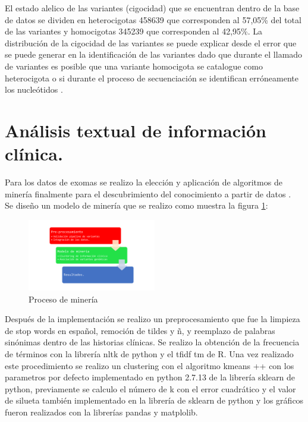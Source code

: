 El estado alelico de las variantes (cigocidad) que se encuentran dentro de la base de datos se dividen en heterocigotas 458639 que corresponden al 57,05\% del total de las variantes  y homocigotas 345239 que corresponden al 42,95\%. La distribución de la cigocidad de las variantes se puede explicar desde el error que se puede generar en la identificación de las variantes dado que durante el llamado  de variantes es posible que una variante homocigota se catalogue como heterocigota o si durante el proceso de secuenciación se identifican erróneamente los nucleótidos \cite{Babraham2016}\cite{Pirooznia2014}. 



\section{Análisis textual de información clínica.}



Para los datos de exomas se realizo la elección y aplicación de algoritmos de minería finalmente para el descubrimiento del conocimiento a partir de datos  \cite{Farid2016}. \\

Se diseño un modelo de minería que se realizo como muestra la figura \ref{fig:mineria}:

\begin{figure}[H]
	\centering
	\includegraphics[width=0.5\textwidth]{Kap4/pipelinemineria}
	\caption{Proceso de minería} \label{fig:mineria}
\end{figure} 

Después de la implementación se realizo un preprocesamiento que fue la limpieza de stop words en español, remoción de tildes y ñ, y reemplazo de palabras sinónimas dentro de las historias clínicas. Se realizo la obtención de la frecuencia de términos con la librería nltk de python y el tfidf tm de R. Una vez realizado este procedimiento se realizo un clustering con el algoritmo kmeans ++  con los parametros por defecto implementado en python 2.7.13 de la librería sklearn de python, previamente se calculo el número de k con el error cuadrático y el valor de silueta también implementado en la librería de sklearn de python y los gráficos fueron realizados con la librerías pandas y matplolib.
 

